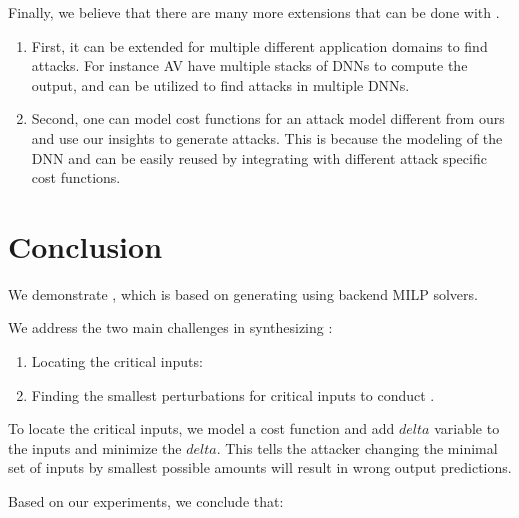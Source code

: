 
Finally, we believe that there are many more extensions that can be done with \tool. 
\begin{enumerate}
	\item First, it can be extended for multiple different application domains to find attacks.
	For instance \ac{AV}  have multiple stacks of \ac{DNN}s to compute the output, and \tool can be utilized to find attacks in multiple \ac{DNN}s. 
	\item Second, one can model cost functions for an attack model different from ours and use our insights to generate attacks. 
	This is because the modeling of the \ac{DNN} and \tool can be easily reused by integrating with different attack specific cost functions. 
\end{enumerate}


\section{Conclusion}

We demonstrate \tool, which is based on generating \attack using backend \ac{MILP} solvers. 

We address the two main challenges in synthesizing \attack: 
\begin{enumerate}
	\item Locating the critical inputs: 
	
	\item Finding the smallest perturbations for critical inputs to conduct \attack.
	
\end{enumerate}
To locate the critical inputs, we model a cost function and add $delta$ variable to the inputs and minimize the $delta$. 
This tells the attacker changing the minimal set of inputs by smallest possible amounts will result in wrong output predictions.

Based on our experiments, we conclude that:

